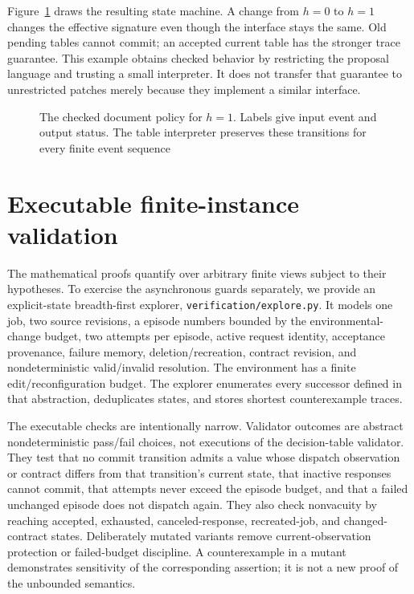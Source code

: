 \documentclass[pdflatex,sn-mathphys-num]{sn-jnl}
\theoremstyle{thmstyleone}
\theoremstyle{thmstylethree}
\theoremstyle{thmstyletwo}
\begin{document}
Figure~\ref{fig:policy} draws the resulting state machine. A change from $h=0$ to $h=1$ changes the effective signature even though the interface stays the same. Old pending tables cannot commit; an accepted current table has the stronger trace guarantee. This example obtains checked behavior by restricting the proposal language and trusting a small interpreter. It does not transfer that guarantee to unrestricted patches merely because they implement a similar interface.
\begin{figure}[tb]
\centering
{}
\caption{The checked document policy for $h=1$. Labels give input event and output status. The table interpreter preserves these transitions for every finite event sequence}\label{fig:policy}
\end{figure}

\section{Executable finite-instance validation}\label{sec:checking}
The mathematical proofs quantify over arbitrary finite views subject to their hypotheses. To exercise the asynchronous guards separately, we provide an explicit-state breadth-first explorer, \texttt{verification/explore.py}. It models one job, two source revisions, a episode numbers bounded by the environmental-change budget, two attempts per episode, active request identity, acceptance provenance, failure memory, deletion/recreation, contract revision, and nondeterministic valid/invalid resolution. The environment has a finite edit/reconfiguration budget. The explorer enumerates every successor defined in that abstraction, deduplicates states, and stores shortest counterexample traces.

The executable checks are intentionally narrow. Validator outcomes are abstract nondeterministic pass/fail choices, not executions of the decision-table validator. They test that no commit transition admits a value whose dispatch observation or contract differs from that transition's current state, that inactive responses cannot commit, that attempts never exceed the episode budget, and that a failed unchanged episode does not dispatch again. They also check nonvacuity by reaching accepted, exhausted, canceled-response, recreated-job, and changed-contract states. Deliberately mutated variants remove current-observation protection or failed-budget discipline. A counterexample in a mutant demonstrates sensitivity of the corresponding assertion; it is not a new proof of the unbounded semantics.
\end{document}
